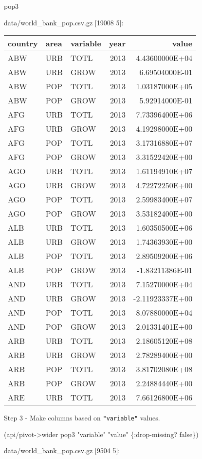 \documentclass[]{article}
\newenvironment{Shaded}{\begin{snugshade}}{\end{snugshade}}
\newcommand{\StringTok}[1]{\textcolor[rgb]{0.31,0.60,0.02}{#1}}
\newcommand{\VariableTok}[1]{\textcolor[rgb]{0.00,0.00,0.00}{#1}}
\newcommand{\AttributeTok}[1]{\textcolor[rgb]{0.77,0.63,0.00}{#1}}
\newcommand{\NormalTok}[1]{#1}
\begin{document}
\begin{Shaded}
\begin{Highlighting}[]
\NormalTok{pop3}
\end{Highlighting}
\end{Shaded}

data/world\_bank\_pop.csv.gz {[}19008 5{]}:

\begin{longtable}[]{@{}lllrr@{}}
\toprule
country & area & variable & year & value\tabularnewline
\midrule
\endhead
ABW & URB & TOTL & 2013 & 4.43600000E+04\tabularnewline
ABW & URB & GROW & 2013 & 6.69504000E-01\tabularnewline
ABW & POP & TOTL & 2013 & 1.03187000E+05\tabularnewline
ABW & POP & GROW & 2013 & 5.92914000E-01\tabularnewline
AFG & URB & TOTL & 2013 & 7.73396400E+06\tabularnewline
AFG & URB & GROW & 2013 & 4.19298000E+00\tabularnewline
AFG & POP & TOTL & 2013 & 3.17316880E+07\tabularnewline
AFG & POP & GROW & 2013 & 3.31522420E+00\tabularnewline
AGO & URB & TOTL & 2013 & 1.61194910E+07\tabularnewline
AGO & URB & GROW & 2013 & 4.72272250E+00\tabularnewline
AGO & POP & TOTL & 2013 & 2.59983400E+07\tabularnewline
AGO & POP & GROW & 2013 & 3.53182400E+00\tabularnewline
ALB & URB & TOTL & 2013 & 1.60350500E+06\tabularnewline
ALB & URB & GROW & 2013 & 1.74363930E+00\tabularnewline
ALB & POP & TOTL & 2013 & 2.89509200E+06\tabularnewline
ALB & POP & GROW & 2013 & -1.83211386E-01\tabularnewline
AND & URB & TOTL & 2013 & 7.15270000E+04\tabularnewline
AND & URB & GROW & 2013 & -2.11923337E+00\tabularnewline
AND & POP & TOTL & 2013 & 8.07880000E+04\tabularnewline
AND & POP & GROW & 2013 & -2.01331401E+00\tabularnewline
ARB & URB & TOTL & 2013 & 2.18605120E+08\tabularnewline
ARB & URB & GROW & 2013 & 2.78289400E+00\tabularnewline
ARB & POP & TOTL & 2013 & 3.81702080E+08\tabularnewline
ARB & POP & GROW & 2013 & 2.24884440E+00\tabularnewline
ARE & URB & TOTL & 2013 & 7.66126800E+06\tabularnewline
\bottomrule
\end{longtable}

Step 3 - Make columns based on \texttt{"variable"} values.

\begin{Shaded}
\begin{Highlighting}[]
\NormalTok{(api/pivot->wider pop3 }\StringTok{"variable"} \StringTok{"value"}\NormalTok{ \{}\AttributeTok{:drop-missing}\NormalTok{? }\VariableTok{false}\NormalTok{\})}
\end{Highlighting}
\end{Shaded}

data/world\_bank\_pop.csv.gz {[}9504 5{]}:
\end{document}
